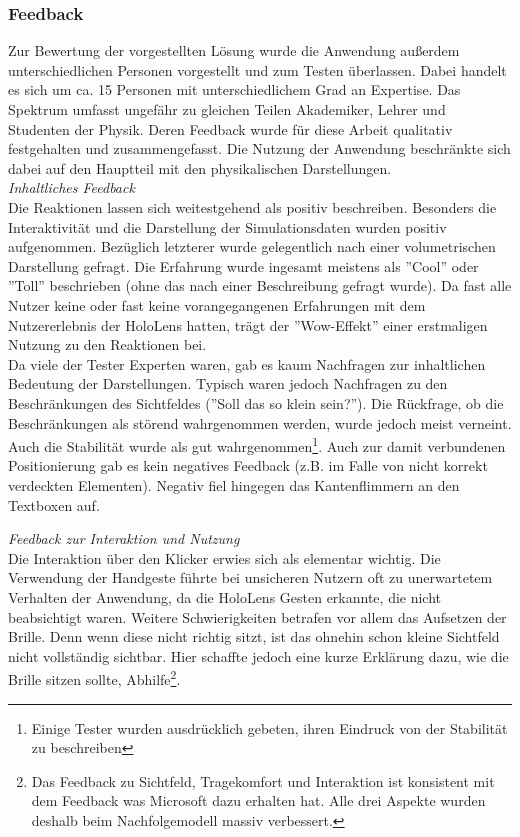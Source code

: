 \subsubsection{Feedback}
Zur Bewertung der vorgestellten Lösung wurde die Anwendung außerdem unterschiedlichen Personen vorgestellt und zum Testen überlassen. Dabei handelt es sich um ca. 15 Personen mit unterschiedlichem Grad an Expertise. Das Spektrum umfasst ungefähr zu gleichen Teilen Akademiker, Lehrer und Studenten der Physik. Deren Feedback wurde für diese Arbeit qualitativ festgehalten und zusammengefasst. Die Nutzung der Anwendung beschränkte sich dabei auf den Hauptteil mit den physikalischen Darstellungen.\\

\textit{Inhaltliches Feedback}\\
Die Reaktionen lassen sich weitestgehend als positiv beschreiben. Besonders die Interaktivität und die Darstellung der Simulationsdaten wurden positiv aufgenommen. Bezüglich letzterer wurde gelegentlich nach einer volumetrischen Darstellung gefragt. Die Erfahrung wurde ingesamt meistens als ''Cool'' oder ''Toll'' beschrieben (ohne das nach einer Beschreibung gefragt wurde). Da fast alle Nutzer keine oder fast keine vorangegangenen Erfahrungen mit dem Nutzererlebnis der HoloLens hatten, trägt der ''Wow-Effekt'' einer erstmaligen Nutzung zu den Reaktionen bei.\\

Da viele der Tester Experten waren, gab es kaum Nachfragen zur inhaltlichen Bedeutung der Darstellungen. Typisch waren jedoch Nachfragen zu den Beschränkungen des Sichtfeldes (''Soll das so klein sein?''). Die Rückfrage, ob die Beschränkungen als störend wahrgenommen werden, wurde jedoch meist verneint. Auch die Stabilität wurde als gut wahrgenommen\footnote{Einige Tester wurden ausdrücklich gebeten, ihren Eindruck von der Stabilität zu beschreiben}. Auch zur damit verbundenen Positionierung gab es kein negatives Feedback (z.B. im Falle von nicht korrekt verdeckten Elementen). Negativ fiel hingegen das Kantenflimmern an den Textboxen auf.

\textit{Feedback zur Interaktion und Nutzung}\\
Die Interaktion über den Klicker erwies sich als elementar wichtig. Die Verwendung der Handgeste führte bei unsicheren Nutzern oft zu unerwartetem Verhalten der Anwendung, da die HoloLens Gesten erkannte, die nicht beabsichtigt waren. Weitere Schwierigkeiten betrafen vor allem das Aufsetzen der Brille. Denn wenn diese nicht richtig sitzt, ist das ohnehin schon kleine Sichtfeld nicht vollständig sichtbar. Hier schaffte jedoch eine kurze Erklärung dazu, wie die Brille sitzen sollte, Abhilfe\footnote{Das Feedback zu Sichtfeld, Tragekomfort und Interaktion ist konsistent mit dem Feedback was Microsoft dazu erhalten hat. Alle drei Aspekte wurden deshalb beim Nachfolgemodell massiv verbessert.}.\\


